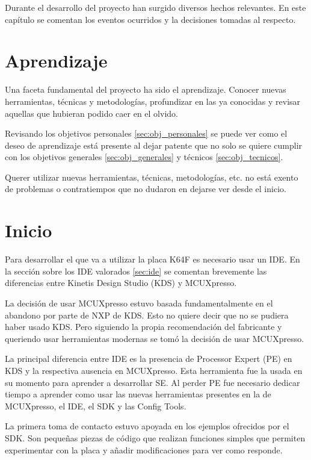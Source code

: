 {\label{ch:aspectos}}
Durante el desarrollo del proyecto han surgido diversos hechos relevantes. En
este capítulo se comentan los eventos ocurridos y la decisiones tomadas al
respecto.

\section{Aprendizaje}{\label{sec:aprendizaje}}
Una faceta fundamental del proyecto ha sido el aprendizaje. Conocer nuevas 
herramientas, técnicas y metodologías, profundizar en las ya conocidas y revisar
aquellas que hubieran podido caer en el olvido.

Revisando los objetivos personales \ref{sec:obj_personales} se puede ver como
el deseo de aprendizaje está presente al dejar patente que no solo se quiere
cumplir con los objetivos generales \ref{sec:obj_generales} y técnicos 
\ref{sec:obj_tecnicos}.

Querer utilizar nuevas herramientas, técnicas, metodologías, etc. no está exento
de problemas o contratiempos que no dudaron en dejarse ver desde el inicio.

\section{Inicio}{\label{sec:inicio}}
Para desarrollar el  que va a utilizar la placa K64F
es necesario usar un IDE. En la sección sobre los IDE valorados \ref{sec:ide}
se comentan brevemente las diferencias entre Kinetis Design Studio (KDS) y
MCUXpresso.

La decisión de usar MCUXpresso estuvo basada fundamentalmente en el abandono
por parte de NXP de KDS. Esto no quiere decir que no se pudiera haber usado KDS.
Pero siguiendo la propia recomendación del fabricante y queriendo usar
herramientas modernas se tomó la decisión de usar MCUXpresso.

La principal diferencia entre IDE es la presencia de Processor Expert (PE) en
KDS y la respectiva ausencia en MCUXpresso. Esta herramienta fue la usada en su
momento para aprender a desarrollar SE. Al perder PE fue necesario dedicar
tiempo a aprender como usar las nuevas herramientas presentes en la
 de MCUXpresso, el IDE, el SDK y las Config Tools.

La primera toma de contacto estuvo apoyada en los ejemplos ofrecidos por el SDK.
Son pequeñas piezas de código que realizan funciones simples que permiten
experimentar con la placa y añadir modificaciones para ver como responde.

